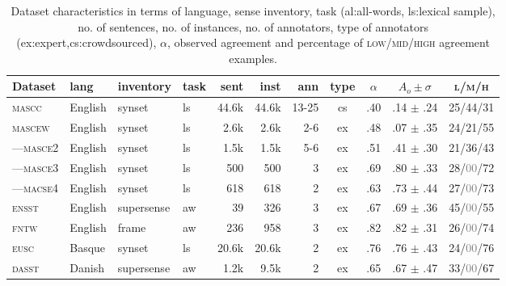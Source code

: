 \documentclass[11pt,a4paper]{article}
\begin{document}
\begin{table}[Ht!]

\begin{center}
  \begin{tabular}{llllrrrcccc}
  \toprule 

Dataset& lang & inventory & task & sent & inst & ann & type & $\alpha$ & $A_o\pm\sigma$ & \textsc{l/m/h}\\ 
\midrule 

\textsc{mascc} & English & synset & ls & 44.6k & 44.6k & 13-25 & cs & .40 & .14 $\pm$ .24 & 25/44/31\\
\textsc{mascew} & English & synset & ls & 2.6k & 2.6k & 2-6 & ex & .48 & .07 $\pm$ .35 & 24/21/55\\
---\textsc{masce2} & English & synset & ls & 1.5k & 1.5k & 5-6 & ex & .51 & .41 $\pm$ .30 & 21/36/43\\
---\textsc{masce3} & English & synset & ls & 500 & 500 & 3 & ex & .69 & .80 $\pm$ .33 & 28/\textcolor{gray}{00}/72\\
---\textsc{macse4} & English & synset & ls & 618 & 618 & 2 & ex & .63 & .73 $\pm$ .44 & 27/\textcolor{gray}{00}/73\\
\textsc{ensst} & English & supersense & aw & 39 & 326 & 3 & ex & .67 & .69 $\pm$ .36 & 45/\textcolor{gray}{00}/55\\
\textsc{fntw} & English & frame & aw & 236 & 958 & 3 & ex & .82 & .82 $\pm$ .31 & 26/\textcolor{gray}{00}/74\\

\textsc{eusc} & Basque & synset & ls & 20.6k & 20.6k & 2 & ex & .76 & .76 $\pm$ .43 & 24/\textcolor{gray}{00}/76\\
\textsc{dasst} & Danish & supersense & aw & 1.2k & 9.5k & 2 & ex & .65 & .67 $\pm$ .47 & 33/\textcolor{gray}{00}/67\\


\bottomrule

  \end{tabular}  
\end{center}
\caption{Dataset characteristics \label{tab:data} in terms of language, sense inventory, task (al:all-words, ls:lexical sample), no. of sentences, no. of instances, no. of annotators, type of annotators (ex:expert,cs:crowdsourced), $\alpha$, observed agreement and percentage of \textsc{low/mid/high} agreement examples.}
\end{table} 
\end{document}
